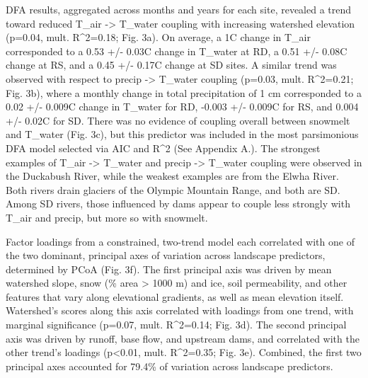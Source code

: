 DFA results, aggregated across months and years for each site, revealed a trend toward reduced T_{air} -> T_{water} coupling with increasing watershed elevation (p=0.04, mult. R^2=0.18; Fig. 3a). On average, a 1\degree C change in T_air corresponded to a 0.53 +/- 0.03\degree C change in T_water at RD, a 0.51 +/- 0.08\degree C change at RS, and a 0.45 +/- 0.17\degree C change at SD sites. A similar trend was observed with respect to precip -> T_{water} coupling (p=0.03, mult. R^2=0.21; Fig. 3b), where a monthly change in total precipitation of 1 cm corresponded to a 0.02 +/- 0.009\degree C change in T_water for RD, -0.003 +/- 0.009\degree C for RS, and 0.004 +/- 0.02\degree C for SD. There was no evidence of coupling overall between snowmelt and T_water (Fig. 3c), but this predictor was included in the most parsimonious DFA model selected via AIC and R^2 (See Appendix A.). The strongest examples of T_{air} -> T_{water} and precip -> T_{water} coupling were observed in the Duckabush River, while the weakest examples are from the Elwha River. Both rivers drain glaciers of the Olympic Mountain Range, and both are SD. Among SD rivers, those influenced by dams appear to couple less strongly with T_air and precip, but more so with snowmelt.

Factor loadings from a constrained, two-trend model each correlated with one of the two dominant, principal axes of variation across landscape predictors, determined by PCoA (Fig. 3f). The first principal axis was driven by mean watershed slope, snow (\% area > 1000 m) and ice, soil permeability, and other features that vary along elevational gradients, as well as mean elevation itself. Watershed's scores along this axis correlated with loadings from one trend, with marginal significance (p=0.07, mult. R^2=0.14; Fig. 3d). The second principal axis was driven by runoff, base flow, and upstream dams, and correlated with the other trend's loadings (p<0.01, mult. R^2=0.35; Fig. 3e). Combined, the first two principal axes accounted for 79.4\% of variation across landscape predictors.

